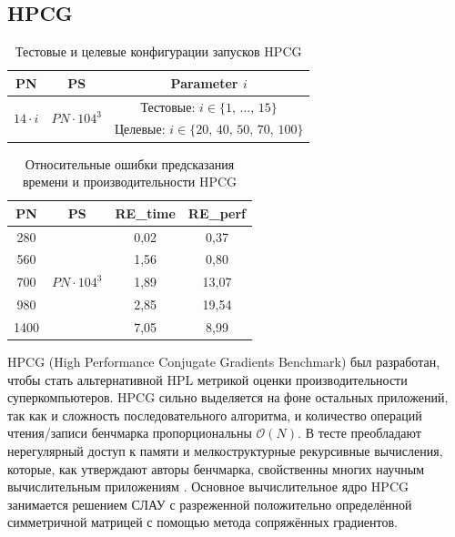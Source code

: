 	\subsection{HPCG}
		\begin{table}[h]
			\centering
			\begin{tabular}{|c|c|c|}
				\hline
				PN                          & PS                                 & Parameter \(i\)                                 \\ \hline
				\multirow{2}{*}{\(14 \cdot i\)} & \multirow{2}{*}{\(PN \cdot 104^3\)} & Тестовые: \(i \in \{1,\,\ldots,\,15\}\)         \\ \cline{3-3}
				                            &                                    & Целевые:  \(i \in \{20,\,40,\,50,\,70,\,100\}\) \\ \hline
			\end{tabular}
			\caption{Тестовые и целевые конфигурации запусков HPCG}
			\label{conf_HPCG}
		\end{table}
		\begin{table}[h]
			\centering
			\begin{tabular}{|c|c|c|c|}
				\hline
				PN	& PS  & RE\_time & RE\_perf \\ \hline
				280 & \multirow{5}{*}{\(PN \cdot 104^3\)} & 0,02     & 0,37     \\ \cline{1-1} \cline{3-4}
				560 &     & 1,56     & 0,80     \\ \cline{1-1} \cline{3-4}
				700 &     & 1,89     & 13,07    \\ \cline{1-1} \cline{3-4}
				980	&     & 2,85     & 19,54    \\ \cline{1-1} \cline{3-4}
				1400 &    & 7,05     & 8,99     \\ \hline
			\end{tabular}
			\caption{Относительные ошибки предсказания времени и производительности HPCG}
			\label{result_HPCG}
		\end{table}
		HPCG (High Performance Conjugate Gradients Benchmark) был разработан, чтобы стать альтернативной HPL метрикой оценки производительности суперкомпьютеров. HPCG сильно выделяется на фоне остальных приложений, так как и сложность последовательного алгоритма, и количество операций чтения/записи бенчмарка пропорциональны \(\mathcal{O}(N)\). В тесте преобладают нерегулярный доступ к памяти и мелкоструктурные рекурсивные вычисления, которые, как утверждают авторы бенчмарка, свойственны многих научным вычислительным приложениям \cite{HPCG}. Основное вычислительное ядро HPCG занимается решением СЛАУ с разреженной положительно определённой симметричной матрицей с помощью метода сопряжённых градиентов.

